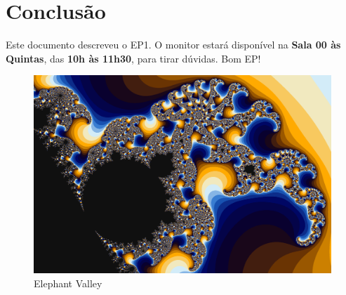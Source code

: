 \documentclass[final,12pt,a4paper]{elsarticle}
\begin{document}
\section{Conclusão}

Este documento descreveu o EP1. O monitor estará disponível na \textbf{Sala 00
às Quintas}, das \textbf{10h às 11h30}, para tirar dúvidas. Bom EP!

\begin{figure}[htpb]
    \centering
    \includegraphics[width=\textwidth]{elephant}
    \caption{Elephant Valley}
\end{figure}










\end{document}
